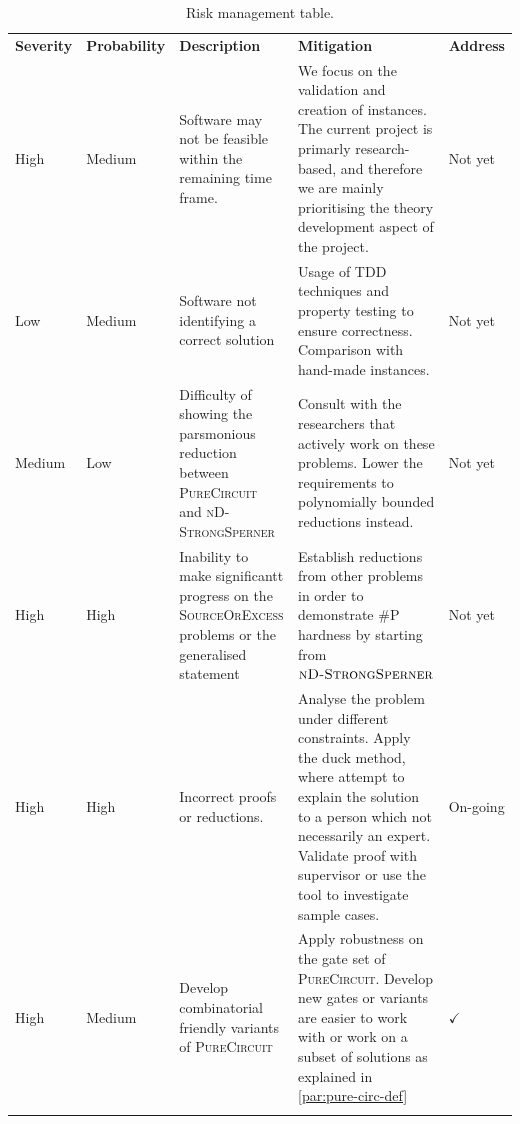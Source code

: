 \begin{xltabular}{0.95\linewidth}{|Z{1.2cm}|Z{1.75cm}|Y|Y|Z{1.2cm}|}
        \hline
        \textbf{Severity} & \textbf{Probability} & \textbf{Description} & \textbf{Mitigation} & \textbf{Address} \\
        \hhline{|=|=|=|=|=|}
        High   & Medium & Software may not be feasible within the remaining time frame. & We focus on the validation and creation of instances.
        The current project is primarly research-based, and therefore we are mainly prioritising the theory development aspect of the project. & Not yet      \\ \hline
        Low    & Medium & Software not identifying a correct solution & Usage of TDD techniques and property testing to ensure correctness.  Comparison with hand-made instances. & Not yet      \\ \hline
        Medium & Low    & Difficulty of showing the parsmonious reduction between  \textsc{PureCircuit} and  \textsc{nD-StrongSperner} & Consult with the researchers that actively work on these problems. Lower the requirements
               to polynomially bounded reductions instead. &  Not yet \\ \hline
        High   & High   & Inability to make significantt progress on the \textsc{SourceOrExcess} problems or the generalised statement &
        Establish reductions from other problems in order to demonstrate \textsc{\#P} hardness by starting from $\textsc{nD-StrongSperner}$& Not yet \\ \hline
        High   & High   & Incorrect proofs or reductions. &
        Analyse the problem under different constraints.
            Apply the duck method, where attempt to explain the solution to a person which not necessarily an expert. Validate proof with supervisor or
               use the tool to investigate sample cases. & On-going  \\ \hline
        High   & Medium & Develop combinatorial friendly variants of \textsc{PureCircuit} & Apply robustness on the gate set of \textsc{PureCircuit}. Develop new gates or variants are easier to work with or work
        on a subset of solutions as explained in \ref{par:pure-circ-def} & $\checkmark$  \\ \hline
        \caption{Risk management table.} \label{tab:management:risk-management}
\end{xltabular}

%
%
